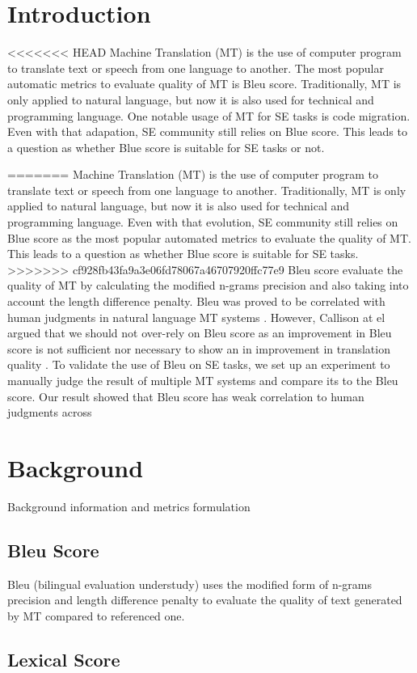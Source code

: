 \section{Introduction}
<<<<<<< HEAD
Machine Translation (MT) is the use of computer program to translate text or speech from one language to another. The most popular automatic metrics to evaluate quality of MT is Bleu score. Traditionally, MT is only applied to natural language, but now it is also used for technical and programming language. One notable usage of MT for SE tasks is code migration. Even with that adapation, SE community still relies on Blue score. This leads to a question as whether Blue score is suitable for SE tasks or not.

 
=======
Machine Translation (MT) is the use of computer program to translate text or speech from one language to another. Traditionally, MT is only applied to natural language, but now it is also used for technical and programming language. Even with that evolution, SE community still relies on Blue score as the most popular automated metrics to evaluate the quality of MT. This leads to a question as whether Blue score is suitable for SE tasks. 
>>>>>>> cf928fb43fa9a3e06fd78067a46707920ffc77e9
Bleu score evaluate the quality of MT by calculating the modified n-grams precision and also taking into account the length difference penalty. Bleu was proved to be correlated with human judgments in natural language MT systems \cite {Papineni02}. However, Callison at el argued that we should not over-rely on Bleu score as an improvement in Bleu score is not sufficient nor necessary to show an in improvement in translation quality \cite {Callison06}. To validate the use of Bleu on SE tasks, we set up an experiment to manually judge the result of multiple MT systems and compare its to the Bleu score. Our result showed that Bleu score has weak correlation to human judgments across 
\section{Background}
Background information and metrics formulation
\subsection{Bleu Score}
Bleu (bilingual evaluation understudy) uses the modified form of n-grams precision and length difference penalty to evaluate the quality of text generated by MT compared to referenced one.
\subsection{Lexical Score}
